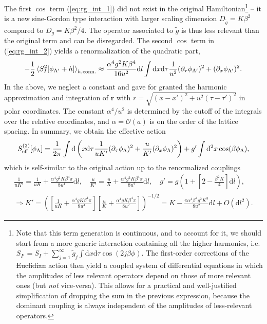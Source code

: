 \documentclass{svmono}
\def\rd{\mathrm d}
\newcommand{\commutator}[1]{\left[ #1 \right]}
\newcommand{\brlr}[1]{\left( #1 \right)}
\providecommand{\DIFaddtex}[1]{{\protect\color{blue}\uwave{#1}}} %
\providecommand{\DIFdeltex}[1]{{\protect\color{red}\sout{#1}}}                      %
\providecommand{\DIFaddbegin}{} %
\providecommand{\DIFaddend}{} %
\providecommand{\DIFdelbegin}{} %
\providecommand{\DIFdelend}{} %
\providecommand{\DIFadd}[1]{\texorpdfstring{\DIFaddtex{#1}}{#1}} %
\providecommand{\DIFdel}[1]{\texorpdfstring{\DIFdeltex{#1}}{}} %
\newcommand{\DIFscaledelfig}{0.5}
\newlength{\DIFdelgraphicswidth} %
\newlength{\DIFdelgraphicsheight} %
\newcommand{\DIFaddincludegraphics}[2][]{{\color{blue}\fbox{\DIFOincludegraphics[#1]{#2}}}} %
\newcommand{\DIFdelincludegraphics}[2][]{%
\sbox{\DIFdelgraphicsbox}{\DIFOincludegraphics[#1]{#2}}%
\settoboxwidth{\DIFdelgraphicswidth}{\DIFdelgraphicsbox} %
\settoboxtotalheight{\DIFdelgraphicsheight}{\DIFdelgraphicsbox} %
\scalebox{\DIFscaledelfig}{%
\parbox[b]{\DIFdelgraphicswidth}{\usebox{\DIFdelgraphicsbox}\\[-\baselineskip] \rule{\DIFdelgraphicswidth}{0em}}\llap{\resizebox{\DIFdelgraphicswidth}{\DIFdelgraphicsheight}{%
\setlength{\unitlength}{\DIFdelgraphicswidth}%
\begin{picture}(1,1)%
\thicklines\linethickness{2pt} %
{\color[rgb]{1,0,0}\put(0,0){\framebox(1,1){}}}%
{\color[rgb]{1,0,0}\put(0,0){\line( 1,1){1}}}%
{\color[rgb]{1,0,0}\put(0,1){\line(1,-1){1}}}%
\end{picture}%
}\hspace*{3pt}}} %
} %
\DeclareRobustCommand{\DIFaddbegin}{\DIFOaddbegin \let\includegraphics\DIFaddincludegraphics} %
\DeclareRobustCommand{\DIFaddend}{\DIFOaddend \let\includegraphics\DIFOincludegraphics} %
\DeclareRobustCommand{\DIFdelbegin}{\DIFOdelbegin \let\includegraphics\DIFdelincludegraphics} %
\DeclareRobustCommand{\DIFdelend}{\DIFOaddend \let\includegraphics\DIFOincludegraphics} %
\begin{document}
The first $\cos$ term (\cref{eq:rg_int_1}) did not exist in the original Hamiltonian\footnote{
    Note that this term generation is continuous, and to account for it, we should start from a more generic interaction containing all the higher harmonics, i.e. $S_{I'} = S_I + \sum_{j=1}^\infty \tilde g_j\int\rd x\rd\tau\cos(2j\beta\phi)$.
    The first-order corrections of the \DIFdelbegin \DIFdel{Euclidian }\DIFdelend \DIFaddbegin \DIFadd{Euclidean }\DIFaddend action then yield a coupled system of differential equations in which the amplitudes of less relevant operators depend on those of more relevant ones (but {\it not} vice-versa).
    This allows for a practical and well-justified simplification of dropping the sum in the previous expression, because the dominant coupling is always independent of the amplitudes of less-relevant operators.
} -- it is a new sine-Gordon type interaction with larger scaling dimension $D_{\tilde g} = K\beta^2$ compared to $D_g=K\beta^2/4$.
The operator associated to $\tilde g$ is thus less relevant than the original term and can be disregarded.
The second $\cos$ term in (\cref{eq:rg_int_2}) yields a renormalization of the quadratic part,
\begin{align}
    -\frac12\braket{S^2_I[\phi_{\Lambda'}+h]}_{h,{\rm conn.}}
    \approx
    \frac{\alpha^4 g^2K\beta^4}{16u^2}\rd l\int\rd x\rd\tau\frac1{u^2}(\partial_
    \tau\phi_{\Lambda'})^2+(\partial_x\phi_{\Lambda'})^2.
    \label{eq:RG_second_order_approximation}
\end{align}
In the above, we neglect a constant and gave for granted the harmonic approximation and integration of $\bm r$ with $r=\sqrt{(x-x')^2+u^2(\tau-\tau')^2}$ in polar coordinates.
The constant $\alpha^4/u^2$ is determined by the cutoff of the integrals over the relative coordinates, and $\alpha=\mathcal O(a)$ is on the order of the lattice spacing.
In summary, we obtain the effective action
\begin{align}
    S_{\rm eff}^{(2)}[\phi_\Lambda] = \frac1{2\pi}\int\rd\brlr{ x\rd\tau\frac{1}{uK'}(\partial_\tau\phi_\Lambda)^2 + \frac{u}{K'}(\partial_x\phi_\Lambda)^2} +  g'\int\rd^2 x\cos(\beta\phi_\Lambda),
\end{align}
which is self-similar to the original action up to the renormalized couplings
\begin{align}
    \frac1{uK'}=\frac1{uK}+\frac{\alpha^4 g^2 K\beta^4\pi}{8 u^4}\rd l,
    \quad
    \frac u{K'}=\frac u{K}+\frac{\alpha^4 g^2 K\beta^4\pi}{8u^2}\rd l,
    \quad
    g' = g\brlr{1 + \commutator{2-\frac{\beta^2 K}4}\rd l},
    \\
    \Rightarrow
    K' = \brlr{\commutator{\frac{1}{uK}+\frac{\alpha^4 g K\beta^4\pi}{8u^4}}\commutator{\frac{u}{K}+\frac{\alpha^4 g K\beta^4\pi}{8u^2}}}^{-1/2}
    =
    K-\frac{\pi \alpha^4 \beta^4 g^2 K^3}{8u^2}\rd l + O(\rd l^2).
\end{align}
\end{document}
